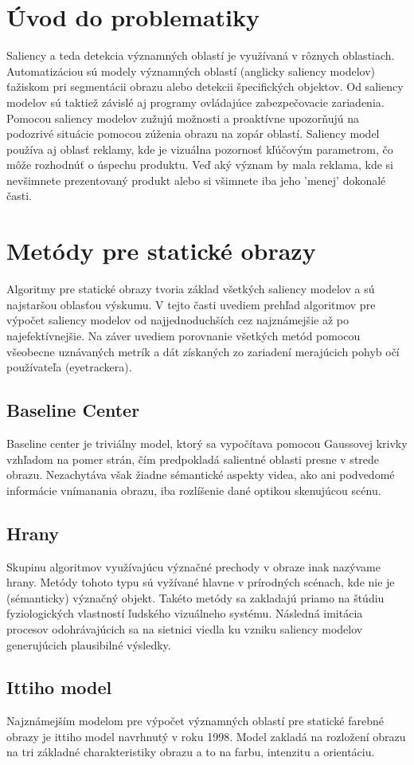 \section{Úvod do problematiky}
Saliency a teda detekcia významných oblastí je využívaná v rôznych oblastiach.
Automatizáciou sú modely významných oblastí (anglicky saliency modelov) ťažiskom pri segmentácii obrazu alebo detekcii špecifických objektov.
Od saliency modelov sú taktiež závislé aj programy ovládajúce zabezpečovacie zariadenia.
Pomocou saliency modelov zužujú možnosti a proaktívne upozorňujú na podozrivé situácie pomocou zúženia obrazu na zopár oblastí.
Saliency model používa aj oblasť reklamy, kde je vizuálna pozornosť kľúčovým parametrom, čo môže rozhodnúť o úspechu produktu.
Veď aký význam by mala reklama, kde si nevšimnete prezentovaný produkt alebo si všimnete iba jeho 'menej' dokonalé časti.
\section{Metódy pre statické obrazy}
Algoritmy pre statické obrazy tvoria základ všetkých saliency modelov a sú najstaršou oblasťou výskumu.
V tejto časti uvediem prehľad algoritmov pre výpočet saliency modelov od najjednoduchších cez najznámejšie až po najefektívnejšie.
Na záver uvediem porovnanie všetkých metód pomocou všeobecne uznávaných metrík a dát získaných zo zariadení merajúcich pohyb očí používateľa (eyetrackera).
\subsection{Baseline Center}\label{section:caseline-center}
Baseline center je triviálny model, ktorý sa vypočítava pomocou Gaussovej krivky vzhľadom na pomer strán, čím predpokladá salientné oblasti presne v strede obrazu.
Nezachytáva však žiadne sémantické aspekty videa, ako ani podvedomé informácie vnímanania obrazu, iba rozlíšenie dané optikou skenujúcou scénu.
\subsection{Hrany}
Skupinu algoritmov využívajúcu význačné prechody v obraze inak nazývame hrany.
Metódy tohoto typu sú vyžívané hlavne v prírodných scénach, kde nie je (sémanticky) význačný objekt.
Takéto metódy sa zakladajú priamo na štúdiu fyziologických vlastností ľudského vizuálneho systému.
Následná imitácia procesov odohrávajúcich sa na sietnici viedla ku vzniku saliency modelov generujúcich plausibilné výsledky\cite{edges-1}.
\subsection{Ittiho model}
Najznámejším modelom pre výpočet významných oblastí pre statické farebné obrazy je ittiho model navrhnutý v roku 1998.
Model zakladá na rozložení obrazu na tri základné charakteristiky obrazu a to na farbu, intenzitu a orientáciu.

